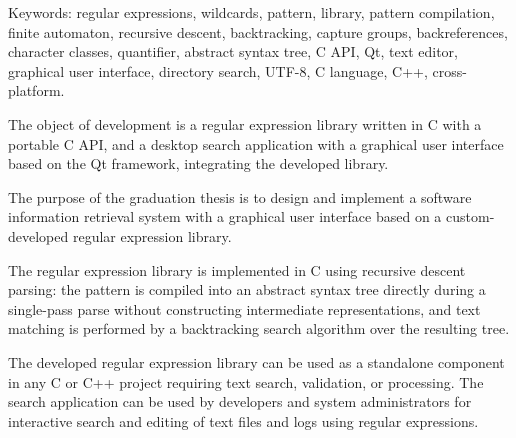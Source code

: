 Keywords: regular expressions, wildcards, pattern, library, pattern compilation, finite automaton, recursive descent, backtracking, capture groups, backreferences, character classes, quantifier, abstract syntax tree, C API, Qt, text editor, graphical user interface, directory search, UTF-8, C language, C++, cross-platform.

The object of development is a regular expression library written in C with a portable C API, and a desktop search application with a graphical user interface based on the Qt framework, integrating the developed library.

The purpose of the graduation thesis is to design and implement a software information retrieval system with a graphical user interface based on a custom-developed regular expression library.

The regular expression library is implemented in C using recursive descent parsing: the pattern is compiled into an abstract syntax tree directly during a single-pass parse without constructing intermediate representations, and text matching is performed by a backtracking search algorithm over the resulting tree.

The developed regular expression library can be used as a standalone component in any C or C++ project requiring text search, validation, or processing. The search application can be used by developers and system administrators for interactive search and editing of text files and logs using regular expressions.


